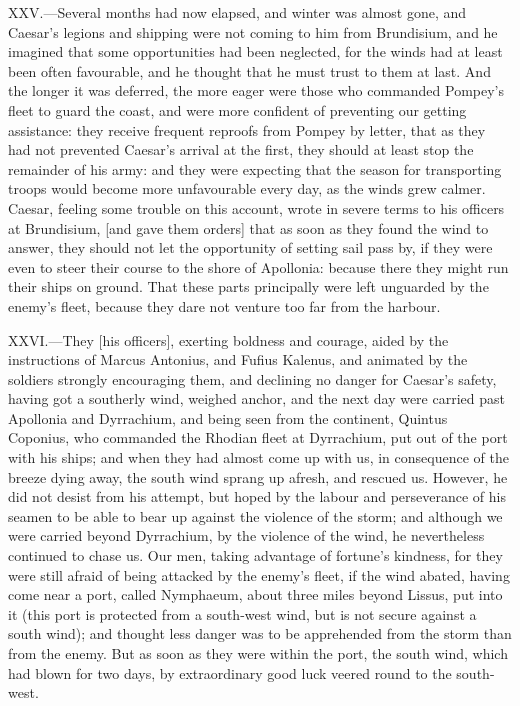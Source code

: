 XXV.—Several months had now elapsed, and winter was almost gone, and
Caesar's legions and shipping were not coming to him from Brundisium,
and he imagined that some opportunities had been neglected, for the
winds had at least been often favourable, and he thought that he must
trust to them at last. And the longer it was deferred, the more eager
were those who commanded Pompey's fleet to guard the coast, and were
more confident of preventing our getting assistance: they receive
frequent reproofs from Pompey by letter, that as they had not prevented
Caesar's arrival at the first, they should at least stop the remainder
of his army: and they were expecting that the season for transporting
troops would become more unfavourable every day, as the winds grew
calmer. Caesar, feeling some trouble on this account, wrote in severe
terms to his officers at Brundisium, [and gave them orders] that as soon
as they found the wind to answer, they should not let the opportunity of
setting sail pass by, if they were even to steer their course to the
shore of Apollonia: because there they might run their ships on ground.
That these parts principally were left unguarded by the enemy's fleet,
because they dare not venture too far from the harbour.

XXVI.—They [his officers], exerting boldness and courage, aided by the
instructions of Marcus Antonius, and Fufius Kalenus, and animated by the
soldiers strongly encouraging them, and declining no danger for Caesar's
safety, having got a southerly wind, weighed anchor, and the next day
were carried past Apollonia and Dyrrachium, and being seen from the
continent, Quintus Coponius, who commanded the Rhodian fleet at
Dyrrachium, put out of the port with his ships; and when they had almost
come up with us, in consequence of the breeze dying away, the south wind
sprang up afresh, and rescued us. However, he did not desist from his
attempt, but hoped by the labour and perseverance of his seamen to be
able to bear up against the violence of the storm; and although we were
carried beyond Dyrrachium, by the violence of the wind, he nevertheless
continued to chase us. Our men, taking advantage of fortune's kindness,
for they were still afraid of being attacked by the enemy's fleet, if
the wind abated, having come near a port, called Nymphaeum, about three
miles beyond Lissus, put into it (this port is protected from a
south-west wind, but is not secure against a south wind); and thought less
danger was to be apprehended from the storm than from the enemy. But as
soon as they were within the port, the south wind, which had blown for
two days, by extraordinary good luck veered round to the south-west.

